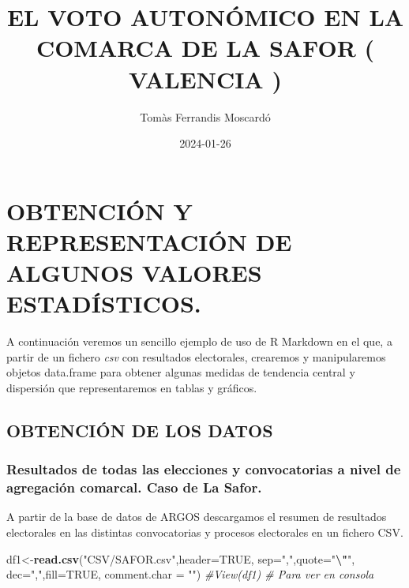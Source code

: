 \documentclass[
]{article}
\title{EL VOTO AUTONÓMICO EN LA COMARCA DE LA SAFOR ( VALENCIA )}
\author{Tomàs Ferrandis Moscardó}
\date{2024-01-26}
\newenvironment{Shaded}{\begin{snugshade}}{\end{snugshade}}
\newcommand{\AttributeTok}[1]{\textcolor[rgb]{0.13,0.29,0.53}{#1}}
\newcommand{\CommentTok}[1]{\textcolor[rgb]{0.56,0.35,0.01}{\textit{#1}}}
\newcommand{\ConstantTok}[1]{\textcolor[rgb]{0.56,0.35,0.01}{#1}}
\newcommand{\FunctionTok}[1]{\textcolor[rgb]{0.13,0.29,0.53}{\textbf{#1}}}
\newcommand{\NormalTok}[1]{#1}
\newcommand{\OtherTok}[1]{\textcolor[rgb]{0.56,0.35,0.01}{#1}}
\newcommand{\SpecialCharTok}[1]{\textcolor[rgb]{0.81,0.36,0.00}{\textbf{#1}}}
\newcommand{\StringTok}[1]{\textcolor[rgb]{0.31,0.60,0.02}{#1}}
\begin{document}
\maketitle

{
\setcounter{tocdepth}{2}
\tableofcontents
}
\hypertarget{obtenciuxf3n-y-representaciuxf3n-de-algunos-valores-estaduxedsticos.}{%
\section{OBTENCIÓN Y REPRESENTACIÓN DE ALGUNOS VALORES
ESTADÍSTICOS.}\label{obtenciuxf3n-y-representaciuxf3n-de-algunos-valores-estaduxedsticos.}}

A continuación veremos un sencillo ejemplo de uso de R Markdown en el
que, a partir de un fichero \emph{csv} con resultados electorales,
crearemos y manipularemos objetos data.frame para obtener algunas
medidas de tendencia central y dispersión que representaremos en tablas
y gráficos.

\hypertarget{obtenciuxf3n-de-los-datos}{%
\subsection{OBTENCIÓN DE LOS DATOS}\label{obtenciuxf3n-de-los-datos}}

\hypertarget{resultados-de-todas-las-elecciones-y-convocatorias-a-nivel-de-agregaciuxf3n-comarcal.-caso-de-la-safor.}{%
\subsubsection{Resultados de todas las elecciones y convocatorias a
nivel de agregación comarcal. Caso de La
Safor.}\label{resultados-de-todas-las-elecciones-y-convocatorias-a-nivel-de-agregaciuxf3n-comarcal.-caso-de-la-safor.}}

A partir de la base de datos de ARGOS descargamos el resumen de
resultados electorales en las distintas convocatorias y procesos
electorales en un fichero CSV.

\begin{Shaded}
\begin{Highlighting}[]
\NormalTok{df1}\OtherTok{\textless{}{-}}\FunctionTok{read.csv}\NormalTok{(}\StringTok{"CSV/SAFOR.csv"}\NormalTok{,}\AttributeTok{header=}\ConstantTok{TRUE}\NormalTok{, }\AttributeTok{sep=}\StringTok{","}\NormalTok{,}\AttributeTok{quote=}\StringTok{"}\SpecialCharTok{\textbackslash{}"}\StringTok{\textquotesingle{}"}\NormalTok{, }\AttributeTok{dec=}\StringTok{","}\NormalTok{,}\AttributeTok{fill=}\ConstantTok{TRUE}\NormalTok{,}
              \AttributeTok{comment.char =} \StringTok{""}\NormalTok{)}
\CommentTok{\#View(df1) \# Para ver en consola}
\end{Highlighting}
\end{Shaded}
\end{document}
